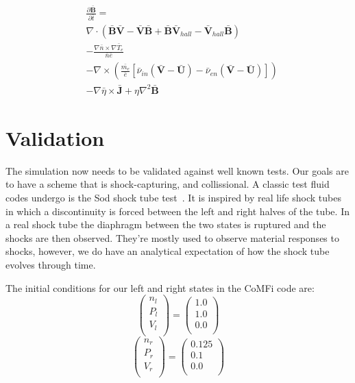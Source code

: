 \documentclass[12pt,upcase]{umlthesis}
\begin{document}
\begin{equation}\label{eq:norminductionequation}
	\begin{aligned}
		& \frac{\partial\bar{\textbf{B}}}{\partial \bar{t}} = \\
		&\nabla\cdot(\bar{\textbf{B}}\bar{\textbf{V}}-\bar{\textbf{V}}\bar{\textbf{B}} + \bar{\textbf{B}}\bar{\textbf{V}}_{hall}-\bar{\textbf{V}}_{hall}\bar{\textbf{B}}) \\
		&-\frac{\nabla \bar{n} \times \nabla \bar{T}_e}{\bar{n}\bar{e}} \\
		&- \nabla\times(\frac{\bar{m_e}}{\bar{e}}[\bar{\nu}_{in} (\bar{\textbf{V}}-\bar{\textbf{U}}) - \bar{\nu}_{en}(\bar{\textbf{V}} - \bar{\textbf{U}})]) \\
		& - \nabla\bar{\eta}\times\bar{\textbf{J}} + \eta\nabla^2\bar{\textbf{B}}
\end{aligned}
\end{equation}


\section{Validation}\label{sec:validation}

The simulation now needs to be validated against well known tests. Our goals are to have a scheme that is shock-capturing, and collissional. A classic test fluid codes undergo is the Sod shock tube test~\citep{Sod1978}. It is inspired by real life shock tubes in which a discontinuity is forced between the left and right halves of the tube. In a real shock tube the diaphragm between the two states is ruptured and the shocks are then observed. They're mostly used to observe material responses to shocks, however, we do have an analytical expectation of how the shock tube evolves through time.

The initial conditions for our left and right states in the CoMFi code are:
\begin{equation}\label{eq:shockinitialconditionsl}
	\begin{pmatrix}
		n_l \\
		P_l \\
		V_l \\
	\end{pmatrix}
	=
	\begin{pmatrix}
		1.0 \\
		1.0 \\
		0.0 \\
	\end{pmatrix}
\end{equation}
\begin{equation}\label{eq:shockinitialconditionsr}
	\begin{pmatrix}
		n_r \\
		P_r \\
		V_r \\
	\end{pmatrix}
	=
	\begin{pmatrix}
		0.125 \\
		0.1 \\
		0.0 \\
	\end{pmatrix}
\end{equation}
	
\end{document}
